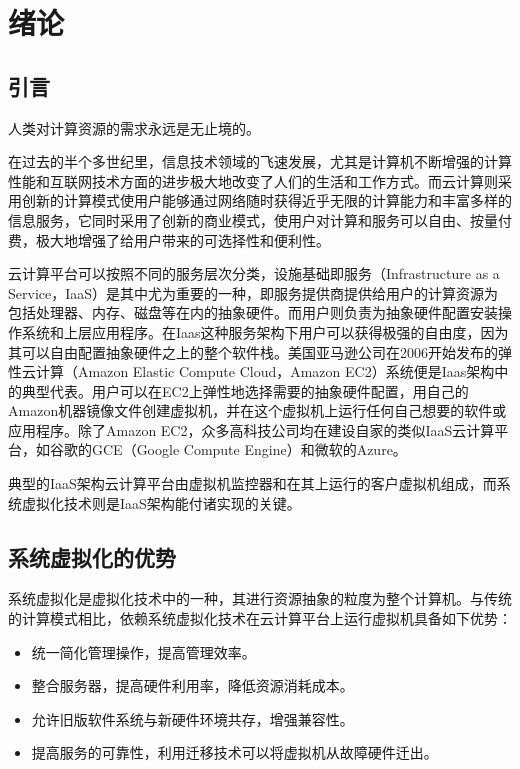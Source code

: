 
\chapter{绪论}
\label{chap:what}

\section{引言}

人类对计算资源的需求永远是无止境的。

在过去的半个多世纪里，信息技术领域的飞速发展，尤其是计算机不断增强的计算性能和互联网技术方面的进步极大地改变了人们的生活和工作方式。而云计算则采用创新的计算模式使用户能够通过网络随时获得近乎无限的计算能力和丰富多样的信息服务，它同时采用了创新的商业模式，使用户对计算和服务可以自由、按量付费，极大地增强了给用户带来的可选择性和便利性。

云计算平台可以按照不同的服务层次分类，设施基础即服务（Infrastructure as a Service，IaaS）是其中尤为重要的一种，即服务提供商提供给用户的计算资源为包括处理器、内存、磁盘等在内的抽象硬件。而用户则负责为抽象硬件配置安装操作系统和上层应用程序。在Iaas这种服务架构下用户可以获得极强的自由度，因为其可以自由配置抽象硬件之上的整个软件栈。美国亚马逊公司在2006开始发布的弹性云计算（Amazon Elastic Compute Cloud，Amazon EC2）系统便是Iaas架构中的典型代表。用户可以在EC2上弹性地选择需要的抽象硬件配置，用自己的Amazon机器镜像文件创建虚拟机，并在这个虚拟机上运行任何自己想要的软件或应用程序。除了Amazon EC2，众多高科技公司均在建设自家的类似IaaS云计算平台，如谷歌的GCE（Google Compute Engine）和微软的Azure。

典型的IaaS架构云计算平台由虚拟机监控器和在其上运行的客户虚拟机组成，而系统虚拟化技术则是IaaS架构能付诸实现的关键。

\section{系统虚拟化的优势}

系统虚拟化是虚拟化技术中的一种，其进行资源抽象的粒度为整个计算机。与传统的计算模式相比，依赖系统虚拟化技术在云计算平台上运行虚拟机具备如下优势：

\begin{itemize}
\item 统一简化管理操作，提高管理效率。
\item 整合服务器，提高硬件利用率，降低资源消耗成本。
\item 允许旧版软件系统与新硬件环境共存，增强兼容性。
\item 提高服务的可靠性，利用迁移技术可以将虚拟机从故障硬件迁出。
\end{itemize}

